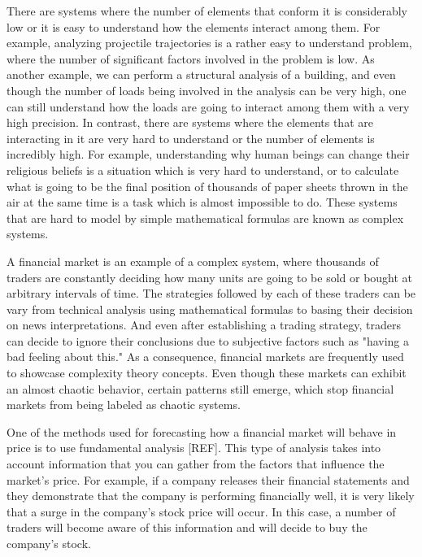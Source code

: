 There are systems where the number of elements that conform it is considerably
low or it is easy to understand how the elements interact among them. For
example, analyzing projectile trajectories is a rather easy to understand
problem, where the number of significant factors involved in the problem is
low. As another example, we can perform a structural analysis of a building, and
even though the number of loads being involved in the analysis can be very high,
one can still understand how the loads are going to interact among them with a
very high precision. In contrast, there are systems where the elements that are
interacting in it are very hard to understand or the number of elements is
incredibly high. For example, understanding why human beings can change their
religious beliefs is a situation which is very hard to understand, or to
calculate what is going to be the final position of thousands of paper sheets
thrown in the air at the same time is a task which is almost impossible to
do. These systems that are hard to model by simple mathematical formulas are
known as complex systems.

A financial market is an example of a complex system, where thousands of traders
are constantly deciding how many units are going to be sold or bought at
arbitrary intervals of time. The strategies followed by each of these traders
can be vary from technical analysis using mathematical formulas to basing their
decision on news interpretations. And even after establishing a trading
strategy, traders can decide to ignore their conclusions due to subjective
factors such as "having a bad feeling about this." As a consequence, financial
markets are frequently used to showcase complexity theory concepts. Even though
these markets can exhibit an almost chaotic behavior, certain patterns still
emerge, which stop financial markets from being labeled as chaotic systems.


One of the methods used for forecasting how a financial market will behave in
price is to use fundamental analysis [REF]. This type of analysis takes into
account information that you can gather from the factors that influence the
market's price. For example, if a company releases their financial statements
and they demonstrate that the company is performing financially well, it is very
likely that a surge in the company's stock price will occur. In this case, a
number of traders will become aware of this information and will decide to buy
the company's stock.

